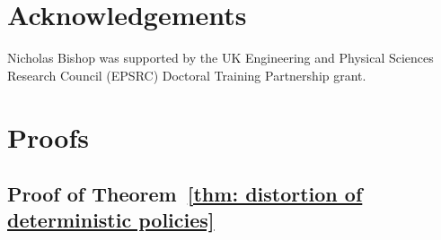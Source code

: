 \documentclass[letterpaper,11pt]{article}
\begin{document}

\section*{Acknowledgements}
Nicholas Bishop was supported by the UK Engineering and Physical Sciences Research Council (EPSRC) Doctoral Training Partnership grant.

\printbibliography






\appendix

\section{Proofs}
\label{appendix - proofs of section 3}

\subsection{Proof of Theorem~\ref{thm: distortion of deterministic policies}}
\end{document}
